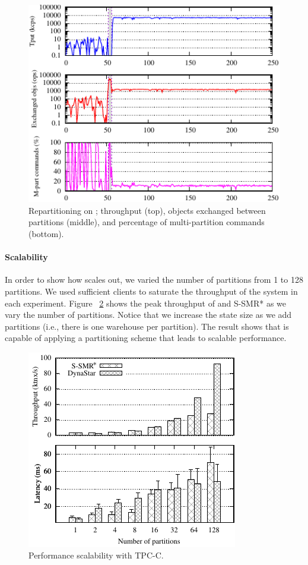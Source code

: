 \begin{figure}[ht!]
  \centering
    \includegraphics[width=0.8\columnwidth]{figures/experiments/tpcc-detail-dynastar}
  \caption{Repartitioning on \dynastar; throughput (top), objects exchanged between partitions (middle), 
  and percentage of multi-partition commands (bottom).}
  \label{fig:tpcc_repartitioning}
\end{figure}

\paragraph*{Scalability}
In order to show how \dynastar scales out, we varied the number of partitions from 1 to 128 partitions. 
We used sufficient clients to  saturate the throughput of the system in each experiment. 
Figure ~\ref{fig:tpcc_scaling} shows the peak throughput of \dynastar and S-SMR* as we vary the 
number of partitions. 
Notice that we increase the state size as we add partitions (i.e., there is one warehouse per partition).
The result shows that \dynastar is capable of applying
a partitioning scheme that leads to scalable performance.

\begin{figure}[ht!]
  \centering
    \includegraphics[width=0.8\columnwidth]{figures/experiments/tpcc-scaling-tp-lat.pdf}
  \caption{Performance scalability with TPC-C.}
  \label{fig:tpcc_scaling}
\end{figure}

